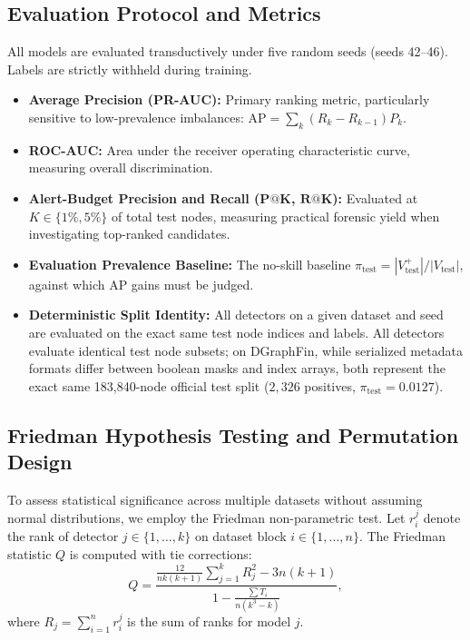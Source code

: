 \documentclass[applsci,article,submit,moreauthors,pdftex]{Definitions/mdpi}
\begin{document}
\subsection{Evaluation Protocol and Metrics}
All models are evaluated transductively under five random seeds (seeds 42--46). Labels are strictly withheld during training.
\begin{itemize}
    \item \textbf{Average Precision (PR-AUC):} Primary ranking metric, particularly sensitive to low-prevalence imbalances: $\mathrm{AP} = \sum_k (R_k - R_{k-1}) P_k$.
    \item \textbf{ROC-AUC:} Area under the receiver operating characteristic curve, measuring overall discrimination.
    \item \textbf{Alert-Budget Precision and Recall ($\mathbf{P@K}$, $\mathbf{R@K}$):} Evaluated at $K \in \{1\%, 5\%\}$ of total test nodes, measuring practical forensic yield when investigating top-ranked candidates.
    \item \textbf{Evaluation Prevalence Baseline:} The no-skill baseline $\pi_{\mathrm{test}} = |V_{\mathrm{test}}^+| / |V_{\mathrm{test}}|$, against which AP gains must be judged.
    \item \textbf{Deterministic Split Identity:} All detectors on a given dataset and seed are evaluated on the exact same test node indices and labels. All detectors evaluate identical test node subsets; on DGraphFin, while serialized metadata formats differ between boolean masks and index arrays, both represent the exact same 183,840-node official test split ($2{,}326$ positives, $\pi_{\mathrm{test}} = 0.0127$).
\end{itemize}

\subsection{Friedman Hypothesis Testing and Permutation Design}
To assess statistical significance across multiple datasets without assuming normal distributions, we employ the Friedman non-parametric test. Let $r_i^j$ denote the rank of detector $j \in \{1, \dots, k\}$ on dataset block $i \in \{1, \dots, n\}$. The Friedman statistic $Q$ is computed with tie corrections:
\begin{equation}
Q = \frac{\frac{12}{n k (k+1)} \sum_{j=1}^k R_j^2 - 3 n (k+1)}{1 - \frac{\sum T_i}{n(k^3 - k)}},
\label{eq:friedman_q}
\end{equation}
where $R_j = \sum_{i=1}^n r_i^j$ is the sum of ranks for model $j$. 
\end{document}
